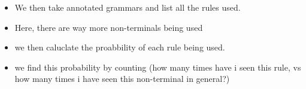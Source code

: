 \documentclass[11pt]{article}
\begin{document}
\begin{minipage}[l]{.5\linewidth}
    \begin{figure}[H]
        \centering
    \end{figure}    
\end{minipage}\hfill
\begin{minipage}[r]{.48\linewidth}
    \begin{itemize}
        \item We then take annotated grammars and list all the rules used.
        \item Here, there are way more non-terminals being used
    \end{itemize}
\end{minipage}

\begin{minipage}[l]{.5\linewidth}
    \begin{figure}[H]
        \centering
    \end{figure}    
\end{minipage}\hfill
\begin{minipage}[r]{.48\linewidth}
    \begin{itemize}
        \item we then caluclate the proabbility of each rule being used.
        \item we find this probability by counting (how many times have i seen this rule, vs how many times i have seen this non-terminal in general?)
    \end{itemize}
\end{minipage}
\end{document}
